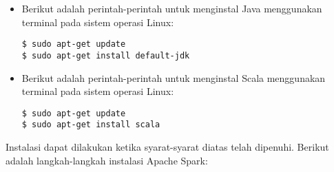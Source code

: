 \begin{itemize}

\item Berikut adalah perintah-perintah untuk menginstal Java menggunakan terminal pada sistem operasi Linux:

\begin{verbatim}
$ sudo apt-get update
$ sudo apt-get install default-jdk
\end{verbatim}

\item Berikut adalah perintah-perintah untuk menginstal Scala menggunakan terminal pada sistem operasi Linux:

\begin{verbatim}
$ sudo apt-get update
$ sudo apt-get install scala
\end{verbatim}

\end{itemize}


Instalasi dapat dilakukan ketika syarat-syarat diatas telah dipenuhi. Berikut adalah langkah-langkah instalasi Apache Spark:

